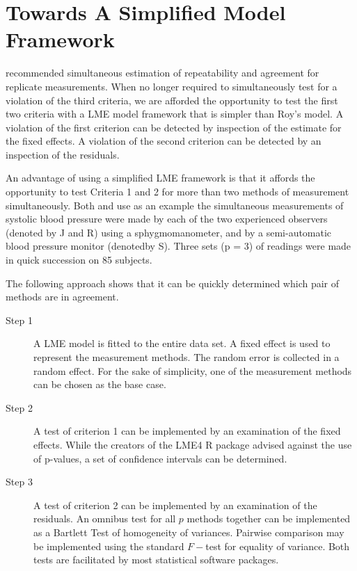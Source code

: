 \documentclass[12pt, a4paper]{report}
\theoremstyle{plain}
\theoremstyle{definition}
\theoremstyle{remark}
\begin{document}
\section{Towards A Simplified Model Framework}
\citet{BA99} recommended simultaneous estimation of repeatability and agreement
for replicate measurements. When no longer required to simultaneously test for a violation of the third criteria, we are afforded the opportunity to test the first two criteria with a LME model framework that is simpler than Roy's model. A violation of the first criterion can be detected by inspection of the estimate for the fixed effects. A violation of the second criterion can be detected by an inspection of the residuals.

An advantage of using a simplified LME framework is that it affords the opportunity to test Criteria 1 and 2 for more than two methods of measurement simultaneously. Both \citet{BA99} and \citet{ARoy2009} use as an example the simultaneous measurements of systolic blood pressure
were made by each of the two experienced observers (denoted by J and R) using a sphygmomanometer, and by a semi-automatic blood pressure monitor (denotedby S). Three sets (p = 3) of readings were made in quick succession on 85 subjects. 

The following approach shows that it can be quickly determined which pair of methods are in agreement.

\begin{description}
\item[Step 1] A LME model is fitted to the entire data set. A fixed effect is used to represent the measurement methods. The random error is collected in a random effect. For the sake of simplicity, one of the measurement methods can be chosen as the base case.

\item[Step 2] A test of criterion 1 can be implemented by an examination of the fixed effects. While the creators of the LME4 R package advised against the use of p-values, a set of confidence intervals can be determined.

\item[Step 3] A test of criterion 2 can be implemented by an examination of the residuals. An omnibus test for all $p$ methods together can be implemented as a Bartlett Test of homogeneity of variances. Pairwise comparison may be implemented using the standard $F-$test for equality of variance. Both tests are facilitated by most statistical software packages.
\end{description}
\end{document}
